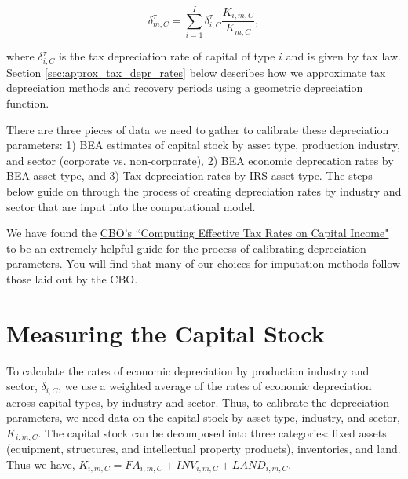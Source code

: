 \documentclass[article,11pt,letterpaper,fleqn]{article}
\theoremstyle{definition}
\numberwithin{equation}{section}
\begin{document}
\begin{equation}
\label{eqn:tax_deprec}
\delta^{\tau}_{m,C}=\sum_{i=1}^{I}\delta^{\tau}_{i,C}\frac{K_{i,m,C}}{K_{m,C}},
\end{equation}

\noindent\noindent where $\delta^{\tau}_{i,C}$ is the tax depreciation rate  of capital of type $i$ and is given by tax law.  Section \ref{sec:approx_tax_depr_rates} below describes how we approximate tax depreciation methods and recovery periods using a geometric depreciation function.

There are three pieces of data we need to gather to calibrate these depreciation parameters: 1) BEA estimates of capital stock by asset type, production industry, and sector (corporate vs. non-corporate), 2) BEA economic deprecation rates by BEA asset type,  and 3) Tax depreciation rates by IRS asset type.  The steps below guide on through the process of creating depreciation rates by industry and sector that are input into the computational  model.

We have found the \href{http://www.cbo.gov/sites/default/files/12-18-taxrates.pdf}{CBO's ``Computing Effective Tax Rates on Capital Income"} to be an extremely helpful guide for the process of calibrating depreciation parameters.  You will find that many of our choices for imputation methods follow those laid out by the CBO.

\section{Measuring the Capital Stock}
\label{sec:step3}

To calculate the rates of economic depreciation by production industry and sector, $\delta_{i,C}$, we use a weighted average of the rates of economic depreciation across capital types, by industry and sector.  Thus, to calibrate the depreciation parameters, we need data on the capital stock by asset type, industry, and sector, $K_{i,m,C}$.  The capital stock can be decomposed into three categories: fixed assets (equipment, structures, and intellectual property products), inventories, and land.  Thus we have,  $K_{i,m,C}={FA}_{i,m,C}+{INV}_{i,m,C}+{LAND}_{i,m,C}$.
\end{document}

